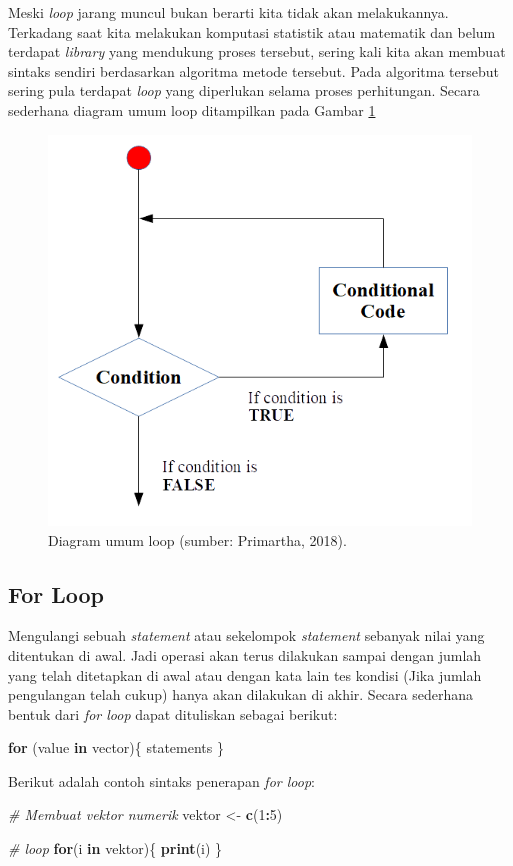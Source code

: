 \documentclass[
]{book}
\newenvironment{Shaded}{\begin{snugshade}}{\end{snugshade}}
\newcommand{\CommentTok}[1]{\textcolor[rgb]{0.56,0.35,0.01}{\textit{#1}}}
\newcommand{\ControlFlowTok}[1]{\textcolor[rgb]{0.13,0.29,0.53}{\textbf{#1}}}
\newcommand{\DecValTok}[1]{\textcolor[rgb]{0.00,0.00,0.81}{#1}}
\newcommand{\FunctionTok}[1]{\textcolor[rgb]{0.13,0.29,0.53}{\textbf{#1}}}
\newcommand{\NormalTok}[1]{#1}
\newcommand{\OtherTok}[1]{\textcolor[rgb]{0.56,0.35,0.01}{#1}}
\newcommand{\SpecialCharTok}[1]{\textcolor[rgb]{0.81,0.36,0.00}{\textbf{#1}}}
\theoremstyle{definition}
\theoremstyle{definition}
\theoremstyle{definition}
\theoremstyle{definition}
\theoremstyle{remark}
\begin{document}
Meski \emph{loop} jarang muncul bukan berarti kita tidak akan melakukannya. Terkadang saat kita melakukan komputasi statistik atau matematik dan belum terdapat \emph{library} yang mendukung proses tersebut, sering kali kita akan membuat sintaks sendiri berdasarkan algoritma metode tersebut. Pada algoritma tersebut sering pula terdapat \emph{loop} yang diperlukan selama proses perhitungan. Secara sederhana diagram umum loop ditampilkan pada Gambar \ref{fig:loop}

\begin{figure}

{\centering \includegraphics[width=0.4\linewidth]{./images/skema_loop} 

}

\caption{Diagram umum loop (sumber: Primartha, 2018).}\label{fig:loop}
\end{figure}

\hypertarget{forloop}{%
\subsection{For Loop}\label{forloop}}

Mengulangi sebuah \emph{statement} atau sekelompok \emph{statement} sebanyak nilai yang ditentukan di awal. Jadi operasi akan terus dilakukan sampai dengan jumlah yang telah ditetapkan di awal atau dengan kata lain tes kondisi (Jika jumlah pengulangan telah cukup) hanya akan dilakukan di akhir. Secara sederhana bentuk dari \emph{for loop} dapat dituliskan sebagai berikut:

\begin{Shaded}
\begin{Highlighting}[]
\ControlFlowTok{for}\NormalTok{ (value }\ControlFlowTok{in}\NormalTok{ vector)\{}
\NormalTok{  statements}
\NormalTok{\}}
\end{Highlighting}
\end{Shaded}

Berikut adalah contoh sintaks penerapan \emph{for loop}:

\begin{Shaded}
\begin{Highlighting}[]
\CommentTok{\# Membuat vektor numerik}
\NormalTok{vektor }\OtherTok{\textless{}{-}} \FunctionTok{c}\NormalTok{(}\DecValTok{1}\SpecialCharTok{:}\DecValTok{5}\NormalTok{)}

\CommentTok{\# loop }
\ControlFlowTok{for}\NormalTok{(i }\ControlFlowTok{in}\NormalTok{ vektor)\{}
  \FunctionTok{print}\NormalTok{(i)}
\NormalTok{\}}
\end{Highlighting}
\end{Shaded}
\end{document}
